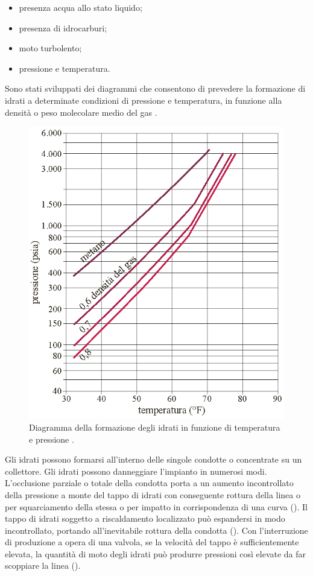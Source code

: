 \begin{itemize}
    \item presenza acqua allo stato liquido;
    \item presenza di idrocarburi;
    \item moto turbolento;
    \item pressione e temperatura.
\end{itemize}
Sono stati sviluppati dei diagrammi che consentono di prevedere la formazione di idrati a determinate condizioni di pressione e temperatura, in funzione alla densità o peso molecolare medio del gas .
\begin{figure}[htbp]
    \centering
    \includegraphics[width=.5\textwidth]{fig/impianti/formazioneidrati.eps}
    \caption{Diagramma della formazione degli idrati in funzione di temperatura e pressione \parencite{bianco2005impiantigas}.}
    \label{fig:formazioneidrati}
\end{figure}
Gli idrati possono formarsi all'interno delle singole condotte o concentrate su un collettore. Gli idrati possono danneggiare l'impianto in numerosi modi. L'occlusione parziale o totale della condotta porta a un aumento incontrollato della pressione a monte del tappo di idrati con conseguente rottura della linea o per squarciamento della stessa o per impatto in corrispondenza di una curva (). Il tappo di idrati soggetto a riscaldamento localizzato può espandersi in modo incontrollato, portando all'inevitabile rottura della condotta (). Con l'interruzione di produzione a opera di una valvola, se la velocità del tappo è sufficientemente elevata, la quantità di moto degli idrati può produrre pressioni così elevate da far scoppiare la linea ().

